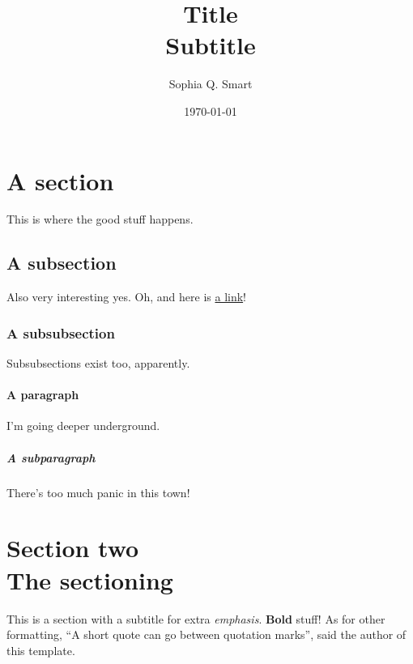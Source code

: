 \documentclass[UKenglish]{article}
\author{Sophia Q. Smart}
\title{\textbf{Title}\\Subtitle}
\date{\today}
\let\stdsection\section
\renewcommand\section{\clearpage\stdsection}
\begin{document}
\maketitle

{ 
\hypersetup{linkcolor=black} %
\setcounter{tocdepth}{2} %
\tableofcontents
}
\pagebreak

\section{A section}
This is where the good stuff happens.


\subsection{A subsection}
Also very interesting yes.
Oh, and here is \href{https://youtu.be/dQw4w9WgXcQ}{a link}!


\subsubsection{A subsubsection}
Subsubsections exist too, apparently.

\paragraph{A paragraph}
I'm going deeper underground.

\subparagraph{A subparagraph}
There's too much panic in this town!

\section[Section two: the sectioning]{Section two \\ \large{The sectioning}}
This is a section with a subtitle for extra \emph{emphasis}.
\textbf{Bold} stuff!
As for other formatting, ``A short quote can go between quotation marks'', said the author of this template.
\end{document}
